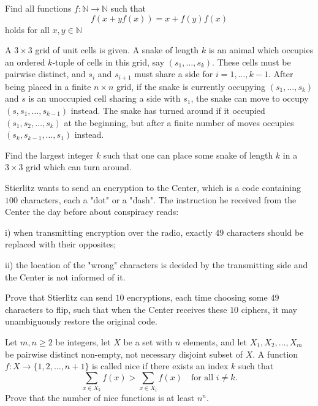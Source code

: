 \documentclass[11pt]{scrartcl}
\begin{document}
\begin{problem}[962645019673192]
Find all functions $ f: \mathbb{N} \to \mathbb{N} $ such that$$ f\left(x+yf\left(x\right)\right) = x+f\left(y\right)f\left(x\right) $$holds for all $ x,y \in \mathbb{N} $
\end{problem}
\begin{problem}[965885167255885]
A $3 \times 3$ grid of unit cells is given. A snake of length $k$ is an animal which occupies an ordered $k$-tuple of cells in this grid, say $(s_1, \dots, s_k)$. These cells must be pairwise distinct, and $s_i$ and $s_{i+1}$ must share a side for $i = 1, \dots, k-1$. After being placed in a finite $n \times n$ grid, if the snake is currently occupying $(s_1, \dots, s_k)$ and $s$ is an unoccupied cell sharing a side with $s_1$, the snake can move to occupy $(s, s_1, \dots, s_{k-1})$ instead. The snake has turned around if it occupied $(s_1, s_2, \dots, s_k)$ at the beginning, but after a finite number of moves occupies $(s_k, s_{k-1}, \dots, s_1)$ instead.

Find the largest integer $k$ such that one can place some snake of length $k$ in a $3 \times 3$ grid which can turn around.
\end{problem}
\begin{problem}[966139221944695]
Stierlitz wants to send an encryption to the Center, which is a code containing $100$ characters, each a "dot" or a "dash". The instruction he received from the Center the day before about conspiracy reads:

i) when transmitting encryption over the radio, exactly $49$ characters should be replaced with their opposites;

ii) the location of the "wrong" characters is decided by the transmitting side and the Center is not informed of it.

Prove that Stierlitz can send $10$ encryptions, each time choosing some $49$ characters to flip, such that when the Center receives these $10$ ciphers, it may unambiguously restore the original code.
\end{problem}
\begin{problem}[967014444176640]
Let $m,n \geqslant 2$ be integers, let $X$ be a set with $n$ elements, and let $X_1,X_2,\ldots,X_m$ be pairwise distinct non-empty, not necessary disjoint subset of $X$. A function $f \colon X \to \{1,2,\ldots,n+1\}$ is called nice if there exists an index $k$ such that\[\sum_{x \in X_k} f(x)>\sum_{x \in X_i} f(x) \quad \text{for all } i \ne k.\]Prove that the number of nice functions is at least $n^n$.
\end{problem}
\end{document}
